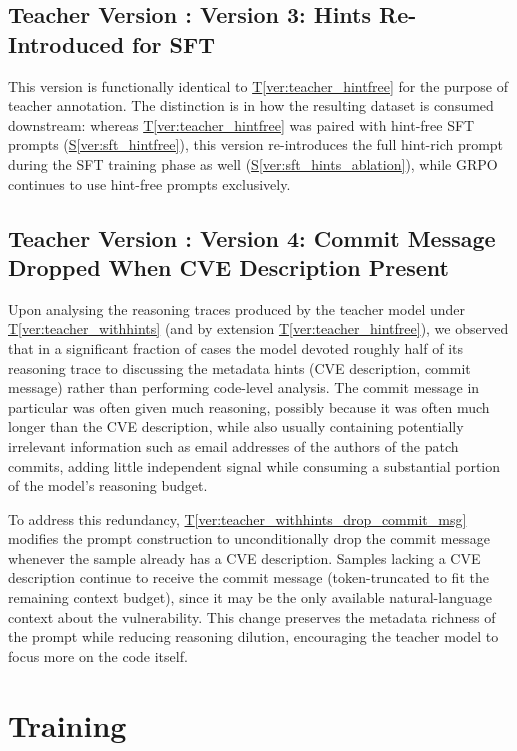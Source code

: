 \documentclass[12pt,a4paper]{article}
\makeatletter
\newcounter{TeacherVer}
\newcommand{\teacherversion}[2]{%
  \stepcounter{TeacherVer}%
  \subsection{Teacher Version \theTeacherVer: #1}%
  \protected@edef\@currentlabel{\theTeacherVer}\label{#2}%
}
\makeatother
\begin{document}
\teacherversion{Version 3: Hints Re-Introduced for SFT}{ver:teacher_withhints}
This version is functionally identical to \hyperref[ver:teacher_hintfree]{T\ref*{ver:teacher_hintfree}} for the purpose of teacher annotation. The distinction is in how the resulting dataset is consumed downstream: whereas \hyperref[ver:teacher_hintfree]{T\ref*{ver:teacher_hintfree}} was paired with hint-free SFT prompts (\hyperref[ver:sft_hintfree]{S\ref*{ver:sft_hintfree}}), this version re-introduces the full hint-rich prompt during the SFT training phase as well (\hyperref[ver:sft_hints_ablation]{S\ref*{ver:sft_hints_ablation}}), while GRPO continues to use hint-free prompts exclusively.

\teacherversion{Version 4: Commit Message Dropped When CVE Description Present}{ver:teacher_withhints_drop_commit_msg}
Upon analysing the reasoning traces produced by the teacher model under \hyperref[ver:teacher_withhints]{T\ref*{ver:teacher_withhints}} (and by extension \hyperref[ver:teacher_hintfree]{T\ref*{ver:teacher_hintfree}}), we observed that in a significant fraction of cases the model devoted roughly half of its reasoning trace to discussing the metadata hints (CVE description, commit message) rather than performing code-level analysis. The commit message in particular was often given much reasoning, possibly because it was often much longer than the CVE description, while also usually containing potentially irrelevant information such as email addresses of the authors of the patch commits, adding little independent signal while consuming a substantial portion of the model's reasoning budget.

To address this redundancy, \hyperref[ver:teacher_withhints_drop_commit_msg]{T\ref*{ver:teacher_withhints_drop_commit_msg}} modifies the prompt construction to unconditionally drop the commit message whenever the sample already has a CVE description. Samples lacking a CVE description continue to receive the commit message (token-truncated to fit the remaining context budget), since it may be the only available natural-language context about the vulnerability. This change preserves the metadata richness of the prompt while reducing reasoning dilution, encouraging the teacher model to focus more on the code itself.

\section{Training}
\end{document}
